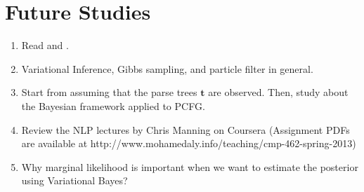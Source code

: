 \documentclass[11pt]{article}
\begin{document}
\section{Future Studies}
\begin{enumerate}
 \item Read \cite{beal2003variational} and \cite{kurihara2004application}.
 \item Variational Inference, Gibbs sampling, and particle filter in general.
 \item Start from assuming that the parse trees $\boldsymbol{t}$ are observed. Then, study about the Bayesian framework applied to PCFG.
 \item Review the NLP lectures by Chris Manning on Coursera (Assignment PDFs are available at http://www.mohamedaly.info/teaching/cmp-462-spring-2013)
 \item Why marginal likelihood is important when we want to estimate the posterior using Variational Bayes?
\end{enumerate}






\end{document}
